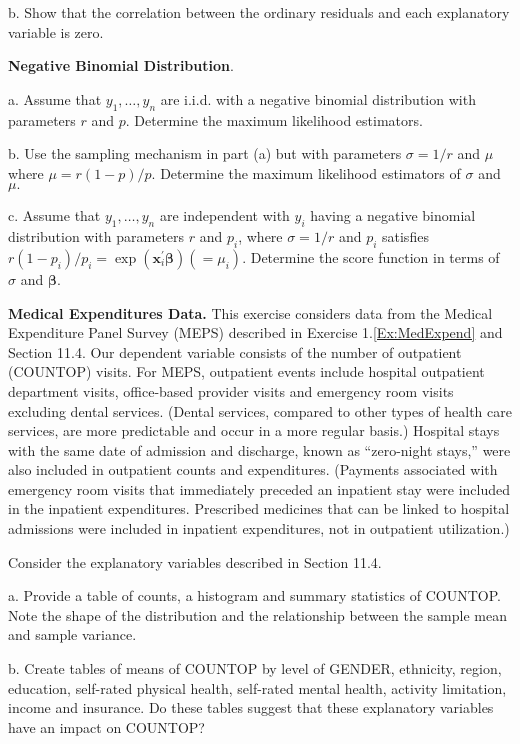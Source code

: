 {\begin{exercises}
b. Show that the correlation between the ordinary residuals and each
explanatory variable is zero.



\item  \textbf{Negative Binomial Distribution}.

a. Assume that $y_1, \ldots, y_n$ are i.i.d. with a negative
binomial distribution with parameters $r$ and $p$. Determine the
maximum likelihood estimators.

b. Use the sampling mechanism in part (a) but with parameters
$\sigma =1/r$ and $\mu$ where $\mu =r(1-p)/p.$ Determine the maximum
likelihood estimators of $\sigma$ and $\mu.$

c. Assume that $y_1, \ldots, y_n$ are independent with $y_i$ having
a negative binomial distribution with parameters $r$ and $p_i$,
where $\sigma =1/r$ and $p_i$ satisfies $r(1-p_i)/p_i=\exp
(\mathbf{x}_i^{\prime }\boldsymbol \beta) (= \mu_i).$ Determine the
score function in terms of $\sigma$ and $\boldsymbol \beta$.


\item   \textbf{Medical Expenditures Data.} This exercise considers data
from the Medical Expenditure Panel Survey (MEPS) described in
Exercise 1.\ref{Ex:MedExpend} and Section 11.4. Our dependent
variable consists of the number of outpatient (COUNTOP) visits. For
MEPS, outpatient events include hospital outpatient department
visits, office-based provider visits and emergency room visits
excluding dental services. (Dental services, compared to other types
of health care services, are more predictable and occur in a more
regular basis.) Hospital stays with the same date of admission and
discharge, known as ``zero-night stays,'' were also included in
outpatient counts and expenditures. (Payments associated with
emergency room visits that immediately preceded an inpatient stay
were included in the inpatient expenditures. Prescribed medicines
that can be linked to hospital admissions were included in inpatient
expenditures, not in outpatient utilization.)

Consider the explanatory variables described in Section 11.4.

a. Provide a table of counts, a histogram and summary statistics of
COUNTOP. Note the shape of the distribution and the relationship
between the sample mean and sample variance.

b. Create tables of means of COUNTOP by level of GENDER, ethnicity,
region, education, self-rated physical health, self-rated mental
health, activity limitation, income and insurance. Do these tables
suggest that these explanatory variables have an impact on COUNTOP?


\end{exercises}}
